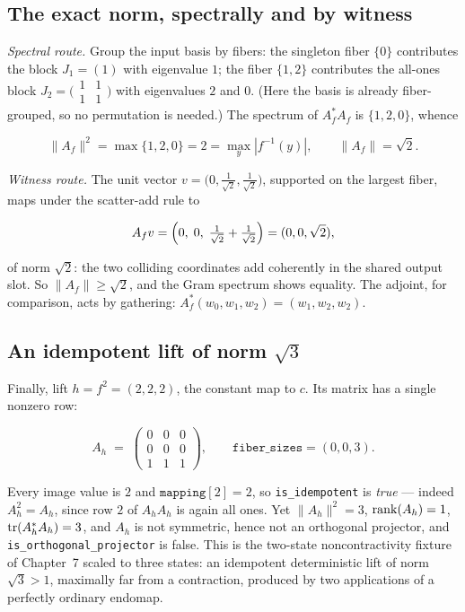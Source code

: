 \subsection{The exact norm, spectrally and by witness}

\emph{Spectral route.} Group the input basis by fibers: the singleton
fiber $\{0\}$ contributes the block $J_1 = (1)$ with eigenvalue $1$;
the fiber $\{1, 2\}$ contributes the all-ones block
$J_2 = \bigl(\begin{smallmatrix}1&1\\1&1\end{smallmatrix}\bigr)$
with eigenvalues $2$ and $0$. (Here the basis is already
fiber-grouped, so no permutation is needed.) The spectrum of
$A_f^{*} A_f$ is $\{1, 2, 0\}$, whence

\[
\lVert A_f \rVert^2 = \max\{1, 2, 0\} = 2
= \max_y |f^{-1}(y)|, \qquad
\lVert A_f \rVert = \sqrt{2} .
\]

\emph{Witness route.} The unit vector
$v = \bigl(0, \tfrac{1}{\sqrt 2}, \tfrac{1}{\sqrt 2}\bigr)$,
supported on the largest fiber, maps under the scatter-add rule to

\[
A_f v = \Bigl(0,\; 0,\; \tfrac{1}{\sqrt2} + \tfrac{1}{\sqrt2}\Bigr)
      = (0, 0, \sqrt 2),
\]

of norm $\sqrt 2$: the two colliding coordinates add coherently in the
shared output slot. So $\lVert A_f\rVert \ge \sqrt 2$, and the Gram
spectrum shows equality. The adjoint, for comparison, acts by
gathering: $A_f^{*}(w_0, w_1, w_2) = (w_1, w_2, w_2)$.

\subsection{An idempotent lift of norm $\sqrt 3$}

Finally, lift $h = f^2 = (2,2,2)$, the constant map to $c$. Its matrix
has a single nonzero row:

\[
A_h \;=\;
\begin{pmatrix}
0 & 0 & 0 \\
0 & 0 & 0 \\
1 & 1 & 1
\end{pmatrix},
\qquad
\texttt{fiber\_sizes} = (0, 0, 3) .
\]

Every image value is $2$ and $\texttt{mapping}[2] = 2$, so
\texttt{is\_idempotent} is \emph{true} --- indeed $A_h^2 = A_h$, since
row $2$ of $A_h A_h$ is again all ones. Yet
$\lVert A_h \rVert^2 = 3$, $\mathrm{rank}(A_h) = 1$,
$\mathrm{tr}(A_h^* A_h) = 3$, and $A_h$ is not symmetric, hence not an
orthogonal projector, and \texttt{is\_orthogonal\_projector} is false.
This is the two-state noncontractivity fixture of Chapter~7 scaled to
three states: an idempotent deterministic lift of norm $\sqrt 3 > 1$,
maximally far from a contraction, produced by two applications of a
perfectly ordinary endomap.

